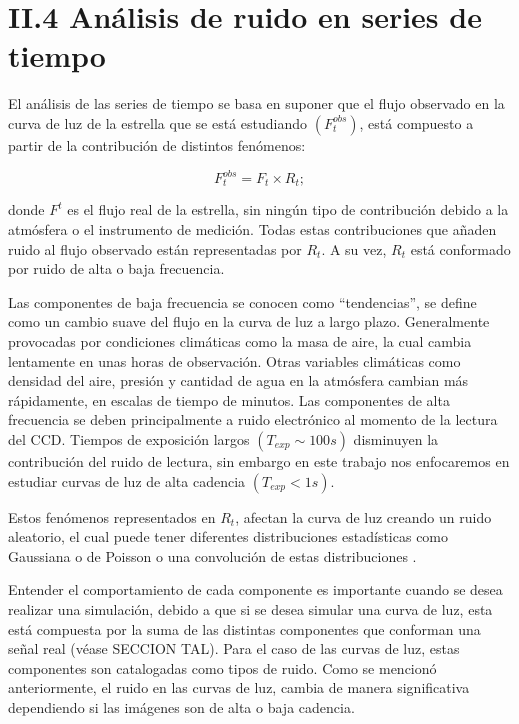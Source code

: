 \section*{II.4 Análisis de ruido en series de tiempo}

El análisis de las series de tiempo se basa en suponer que el flujo observado en la curva de luz de la estrella que se está estudiando $(F^{obs}_{t})$, está  compuesto a partir de la contribución de distintos fenómenos:

\begin{equation}
  \displaystyle F^{obs}_{t}=F_{t}\times R_{t};
\end{equation}

\noindent donde $F^{t}$ es el flujo real de la estrella, sin ningún tipo de contribución debido a la atmósfera o el instrumento de medición. Todas estas contribuciones que añaden ruido al flujo observado están representadas por $R_{t}$. A su vez, $R_{t}$ está conformado por ruido de alta o baja frecuencia. 

Las componentes de baja frecuencia se conocen como ``tendencias'', se define como un cambio suave del flujo en la curva de luz a largo plazo. Generalmente provocadas por condiciones climáticas como la masa de aire, la cual cambia lentamente en unas horas de observación. Otras variables climáticas como densidad del aire, presión y cantidad de agua en la atmósfera cambian más rápidamente, en escalas de tiempo de minutos. Las componentes de alta frecuencia se deben principalmente a ruido electrónico al momento de la lectura del CCD. Tiempos de exposición largos $(T_{exp} \sim 100 s)$ disminuyen la contribución del ruido de lectura, sin embargo en este trabajo nos enfocaremos en estudiar curvas de luz de alta cadencia $(T_{exp} < 1 s)$.

Estos fenómenos representados en $R_{t}$, afectan la curva de luz creando un ruido aleatorio, el cual puede tener diferentes distribuciones estadísticas como Gaussiana o de Poisson o una convolución de estas distribuciones \cite{luisier2010image}.

Entender el comportamiento de cada componente es importante cuando se desea realizar una simulación, debido a que si se desea simular una curva de luz, esta está compuesta por la suma de las distintas componentes que conforman una señal real (véase SECCION TAL). Para el caso de las curvas de luz, estas componentes son catalogadas como tipos de ruido. Como se mencionó anteriormente, el ruido en las curvas de luz, cambia de manera significativa dependiendo si las imágenes son de alta o baja cadencia.

